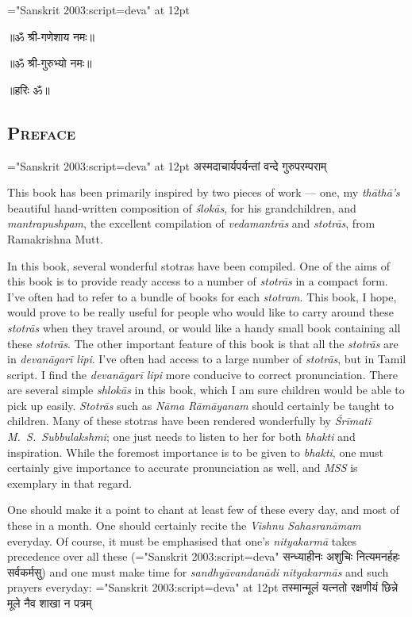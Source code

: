 {\font \x="Sanskrit 2003:script=deva" at 12pt\x
\centerline{॥ॐ श्री-गणेशाय नमः॥}
\centerline{॥ॐ श्री-गुरुभ्यो नमः॥}
\centerline{॥हरिः ॐ॥}
}

\setmainfont{Candara}
\begin{center}
\chapter[\texorpdfstring{\large{\fontspec{Candara}{Preface}}}{Preface}]{\texorpdfstring{\scshape{Preface}}{Preface}}
\end{center}

{\font \x="Sanskrit 2003:script=deva" at 12pt\x
{}
{अस्मदाचार्यपर्यन्तां वन्दे गुरुपरम्पराम्}
}

This book has been primarily inspired by two pieces of work --- one, my \textit{thāthā's} beautiful hand-written composition of \textit{ślokās}, for his grandchildren, and \textit{mantrapushpam}, the excellent compilation of
\textit{veda\-mantrās} and \textit{stotrās}, from Ramakrishna Mutt.

In this book, several wonderful stotras have been compiled. One of the aims of this book is to provide ready access to a number of \textit{stotrās} in a compact form. I've often had to refer to a bundle of books for each \textit{stotram}. This book, I hope, would prove to be really useful for people who would like to carry around these \textit{stotrās} when they travel around, or would like a handy small book containing all these \textit{stotrās}. The other important feature of this book is that all the \textit{stotrās} are in \textit{devanāgarī lipi}. I've often had access to a large number of \textit{stotrās}, but in Tamil script. I find the \textit{devanāgarī lipi} more conducive to correct pronunciation. There are several simple \textit{shlokās} in this book, which I am sure children would be able to pick up easily. \textit{Stotrās} such as \textit{Nāma Rāmāyanam} should certainly be taught to children. Many of these stotras have been rendered wonderfully by \textit{Śrīmatī} \textit{M.~S.~Subbulakshmi}; one just needs to listen to her for both \textit{bhakti} and inspiration. While the foremost importance is to be given to \textit{bhakti}, one must certainly give importance to accurate pronunciation as well, and \textit{MSS} is exemplary in that regard.

One should make it a point to chant at least few of these every day, and most of these in a month. One should certainly recite the \textit{Vishnu Sahasranāmam} everyday. Of course, it must be emphasised that one's \textit{nityakarmā} takes precedence over all these ({\font \x="Sanskrit 2003:script=deva" \x सन्ध्याहीनः अशुचिः नित्यमनर्हहः सर्व\-कर्मसु}) and one must make time for \textit{sandhyāvandanādi} \textit{nityakarmās} and such prayers everyday:
{\font \x="Sanskrit 2003:script=deva" at 12pt\x
{}
{तस्मान्मूलं यत्नतो रक्षणीयं छिन्ने मूले नैव शाखा न पत्रम्}
}

